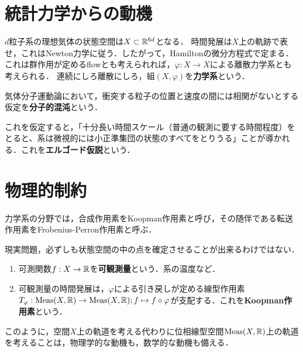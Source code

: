 \documentclass[uplatex,dvipdfmx]{jsreport}
\begin{document}
\section{統計力学からの動機}

\begin{discussion}[問題設定]
    $d$粒子系の理想気体の状態空間は$X\subset\mathbb{R}^{6d}$となる．
    時間発展は$X$上の軌跡で表せ，これはNewton力学に従う．したがって，Hamiltonの微分方程式で定まる．
    これは群作用が定めるflowとも考えられれば，$\varphi:X\to X$による離散力学系とも考えられる．
    連続にしろ離散にしろ，組$(X,\varphi)$を\textbf{力学系}という．
\end{discussion}

\begin{definition}
    気体分子運動論において，衝突する粒子の位置と速度の間には相関がないとする仮定を\textbf{分子的混沌}という．
\end{definition}
\begin{remarks}
    これを仮定すると，「十分長い時間スケール（普通の観測に要する時間程度）をとると、系は微視的には小正準集団の状態のすべてをとりうる」ことが導かれる．これを\textbf{エルゴード仮説}という．
\end{remarks}

\section{物理的制約}

\begin{tcolorbox}[colframe=ForestGreen, colback=ForestGreen!10!white,breakable,colbacktitle=ForestGreen!40!white,coltitle=black,fonttitle=\bfseries\sffamily,
title=]
    力学系の分野では，合成作用素をKoopman作用素と呼び，その随伴である転送作用素をFrobenius-Perron作用素と呼ぶ．
\end{tcolorbox}

\begin{definition}
    現実問題，必ずしも状態空間の中の点を確定させることが出来るわけではない．
    \begin{enumerate}
        \item 可測関数$f:X\to\mathbb{R}$を\textbf{可観測量}という．系の温度など．
        \item 可観測量の時間発展は，$\varphi$による引き戻しが定める線型作用素$T_\varphi:\mathrm{Meas}(X,\mathbb{R})\to\mathrm{Meas}(X,\mathbb{R});f\mapsto f\circ\varphi$が支配する．これを\textbf{Koopman作用素}という．
    \end{enumerate}
\end{definition}
\begin{remarks}
    このように，空間$X$上の軌道を考える代わりに位相線型空間$\mathrm{Meas}(X,\mathbb{R})$上の軌道を考えることは，物理学的な動機も，数学的な動機も備える．
\end{remarks}
\end{document}
